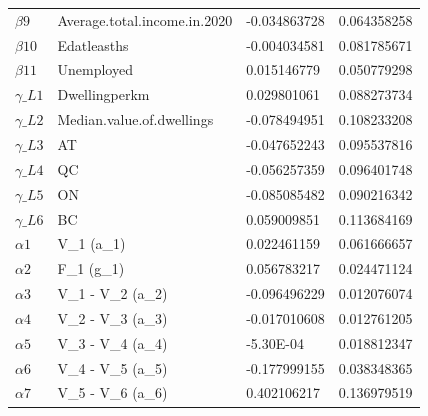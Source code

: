 \documentclass[a4paper,11pt]{article}
\begin{document}
\begin{table}[]
{\begin{tabular}{@{}llll@{}}
$\beta9$          & Average.total.income.in.2020         & -0.034863728 & 0.064358258 \\
$\beta10  $       & Edatleasths                                                 & -0.004034581 & 0.081785671 \\
$\beta11 $        & Unemployed                                                  & 0.015146779  & 0.050779298 \\
$\gamma\_L1$      & Dwellingperkm                                               & 0.029801061  & 0.088273734 \\
$\gamma\_L2$      & Median.value.of.dwellings                              & -0.078494951 & 0.108233208 \\
$\gamma\_L3$      & AT                                                                            & -0.047652243 & 0.095537816 \\
$\gamma\_L4$      & QC                                                                            & -0.056257359 & 0.096401748 \\
$\gamma\_L5$      & ON                                                                            & -0.085085482 & 0.090216342 \\
$\gamma\_L6$      & BC                                                                            & 0.059009851  & 0.113684169 \\
$\alpha1 $        & V\_1 (a\_1)                                                                   & 0.022461159  & 0.061666657 \\
$\alpha2$         & F\_1 (g\_1)                                                                   & 0.056783217  & 0.024471124 \\
$\alpha3$         & V\_1 - V\_2 (a\_2)                                                            & -0.096496229 & 0.012076074 \\
$\alpha4$         & V\_2 - V\_3 (a\_3)                                                            & -0.017010608 & 0.012761205 \\
$\alpha5$         & V\_3 - V\_4 (a\_4)                                                            & -5.30E-04    & 0.018812347 \\
$\alpha6$         & V\_4 - V\_5 (a\_5)                                                            & -0.177999155 & 0.038348365 \\
$\alpha7  $       & V\_5 - V\_6 (a\_6)                                                            & 0.402106217  & 0.136979519 \\

\end{tabular}}
\end{table}
\end{document}
